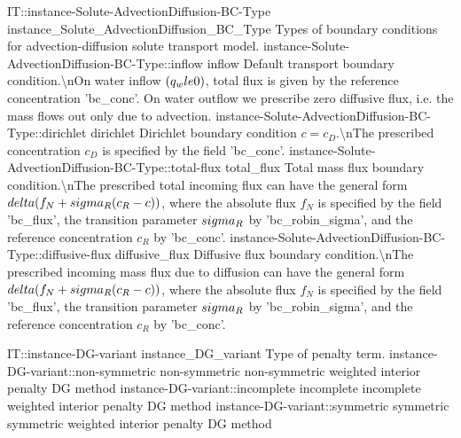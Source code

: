 \begin{SelectionType}
	{IT::instance-Solute-AdvectionDiffusion-BC-Type}
	{instance{\_}Solute{\_}AdvectionDiffusion{\_}BC{\_}Type}
	{{{Types of boundary conditions for advection-diffusion solute transport model.}%
}}
		\SelectionItem
			{instance-Solute-AdvectionDiffusion-BC-Type::inflow}
			{inflow}
			{{{Default transport boundary condition.{\textbackslash}nOn water inflow }{$(q_w \\le 0)$}{, total flux is given by the reference concentration 'bc{\_}conc'. On water outflow we prescribe zero diffusive flux, i.e. the mass flows out only due to advection.}%
}}
		\SelectionItem
			{instance-Solute-AdvectionDiffusion-BC-Type::dirichlet}
			{dirichlet}
			{{{Dirichlet boundary condition }{$ c = c_D $}{.{\textbackslash}nThe prescribed concentration }{$c_D$}{ is specified by the field 'bc{\_}conc'.}%
}}
		\SelectionItem
			{instance-Solute-AdvectionDiffusion-BC-Type::total-flux}
			{total{\_}flux}
			{{{Total mass flux boundary condition.{\textbackslash}nThe prescribed total incoming flux can have the general form }{$\\delta(f_N+\\sigma_R(c_R-c) )$}{, where the absolute flux }{$f_N$}{ is specified by the field 'bc{\_}flux', the transition parameter }{$\\sigma_R$}{ by 'bc{\_}robin{\_}sigma', and the reference concentration }{$c_R$}{ by 'bc{\_}conc'.}%
}}
		\SelectionItem
			{instance-Solute-AdvectionDiffusion-BC-Type::diffusive-flux}
			{diffusive{\_}flux}
			{{{Diffusive flux boundary condition.{\textbackslash}nThe prescribed incoming mass flux due to diffusion can have the general form }{$\\delta(f_N+\\sigma_R(c_R-c) )$}{, where the absolute flux }{$f_N$}{ is specified by the field 'bc{\_}flux', the transition parameter }{$\\sigma_R$}{ by 'bc{\_}robin{\_}sigma', and the reference concentration }{$c_R$}{ by 'bc{\_}conc'.}%
}}
\end{SelectionType}
\begin{SelectionType}
	{IT::instance-DG-variant}
	{instance{\_}DG{\_}variant}
	{{{Type of penalty term.}%
}}
		\SelectionItem
			{instance-DG-variant::non-symmetric}
			{non-symmetric}
			{{{non-symmetric weighted interior penalty DG method}%
}}
		\SelectionItem
			{instance-DG-variant::incomplete}
			{incomplete}
			{{{incomplete weighted interior penalty DG method}%
}}
		\SelectionItem
			{instance-DG-variant::symmetric}
			{symmetric}
			{{{symmetric weighted interior penalty DG method}%
}}
\end{SelectionType}
